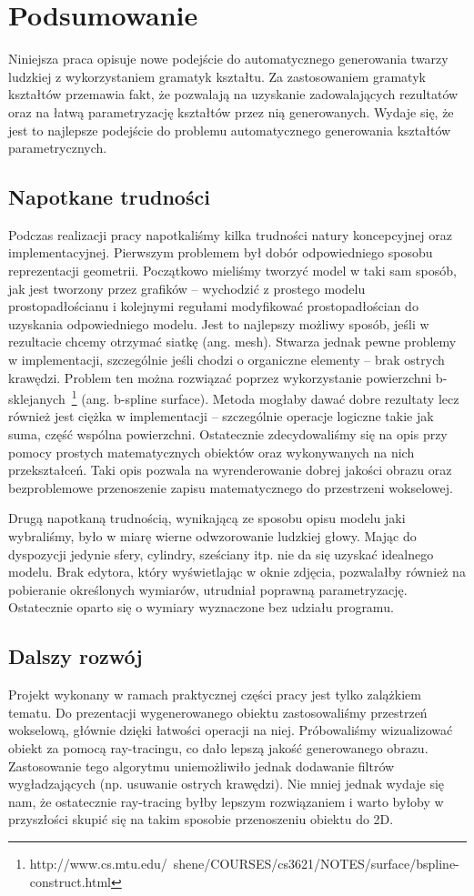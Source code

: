 \section{Podsumowanie}
Niniejsza praca opisuje nowe podejście do automatycznego generowania twarzy
ludzkiej z wykorzystaniem gramatyk kształtu. Za zastosowaniem gramatyk kształtów
przemawia fakt, że pozwalają na uzyskanie zadowalających rezultatów oraz na
łatwą parametryzację kształtów przez nią generowanych. Wydaje się, że jest to
najlepsze podejście do problemu automatycznego generowania kształtów parametrycznych.
\subsection{Napotkane trudności}
Podczas realizacji pracy napotkaliśmy kilka trudności natury koncepcyjnej oraz
implementacyjnej. Pierwszym problemem był dobór
odpowiedniego sposobu reprezentacji geometrii. Początkowo mieliśmy tworzyć model
w taki sam sposób, jak jest tworzony przez grafików -- wychodzić z prostego
modelu prostopadłościanu i kolejnymi regułami modyfikować prostopadłościan do
uzyskania odpowiedniego modelu. Jest to najlepszy możliwy sposób, jeśli w
rezultacie chcemy otrzymać siatkę (ang. mesh). Stwarza jednak pewne problemy w
implementacji, szczególnie jeśli chodzi o organiczne elementy -- brak ostrych
krawędzi. Problem ten można rozwiązać poprzez wykorzystanie powierzchni
b-sklejanych~\footnote{http://www.cs.mtu.edu/~shene/COURSES/cs3621/NOTES/surface/bspline-construct.html}
(ang. b-spline surface). Metoda mogłaby dawać dobre rezultaty lecz
również jest ciężka w implementacji -- szczególnie operacje logiczne takie jak
suma, część wspólna powierzchni. Ostatecznie zdecydowaliśmy się na opis przy
pomocy prostych matematycznych obiektów oraz wykonywanych na nich przekształceń.
Taki opis pozwala na wyrenderowanie dobrej jakości obrazu oraz bezproblemowe
przenoszenie zapisu matematycznego do przestrzeni wokselowej.

Drugą napotkaną trudnością, wynikającą ze sposobu opisu modelu jaki
wybraliśmy, było w miarę wierne odwzorowanie ludzkiej głowy. Mając do
dyspozycji jedynie sfery, cylindry, sześciany itp. nie da się uzyskać idealnego
modelu. Brak edytora, który wyświetlając w oknie zdjęcia, pozwalałby również na
pobieranie określonych wymiarów, utrudniał poprawną parametryzację. Ostatecznie
oparto się o wymiary wyznaczone bez udziału programu.

\subsection{Dalszy rozwój}
Projekt wykonany w ramach praktycznej części pracy jest tylko zalążkiem tematu.
Do prezentacji wygenerowanego obiektu zastosowaliśmy przestrzeń wokselową,
głównie dzięki łatwości operacji na niej. Próbowaliśmy wizualizować obiekt za
pomocą ray-tracingu, co dało lepszą jakość generowanego obrazu. Zastosowanie
tego algorytmu uniemożliwiło jednak dodawanie filtrów wygładzających (np.
usuwanie ostrych krawędzi). Nie mniej jednak wydaje się nam, że ostatecznie
ray-tracing byłby lepszym rozwiązaniem i warto byłoby w przyszłości skupić się
na takim sposobie przenoszeniu obiektu do 2D.

